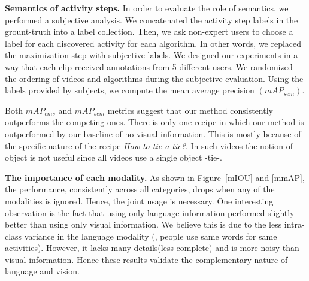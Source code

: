 \vspace{1mm}
\noindent\textbf{Semantics of activity steps.}
In order to evaluate the role of semantics, we performed a subjective analysis. We concatenated the activity step labels in the grount-truth into a label collection. Then, we ask non-expert users to choose a label for each discovered activity for each algorithm. In other words, we replaced the maximization step with subjective labels. We designed our experiments in a way that each clip received annotations from 5 different users. We randomized the ordering of videos and algorithms during the subjective evaluation. Using the labels provided by subjects, we compute the mean average precision $(mAP_{sem})$.

\begin{table}
\caption{Semantic mean-average-precision $mAP_{sem}$.}
\vspace{-3mm}
{\small
{}}
\normalsize
\vspace{-5mm}
\end{table}

Both $mAP_{cms}$ and $mAP_{sem}$ metrics suggest that our method consistently outperforms the competing ones. There is only one recipe in which our method is outperformed by our baseline of no visual information. This is mostly because of the specific nature of the recipe \emph{How to tie a tie?}. In such videos the notion of object is not useful since all videos use a single object -tie-.

\vspace{1mm}
\noindent\textbf{The importance of each modality.}
As shown in Figure~\ref{mIOU} and \ref{mmAP}, the performance, consistently across all categories, drops when any of the modalities is ignored. Hence, the joint usage is necessary. One interesting observation is the fact that using only language information performed slightly better than using only visual information. We believe this is due to the less intra-class variance in the language modality (\ie, people use same words for same activities). However, it lacks many details(less complete) and is more noisy than visual information. Hence these results validate the complementary nature of language and vision.

